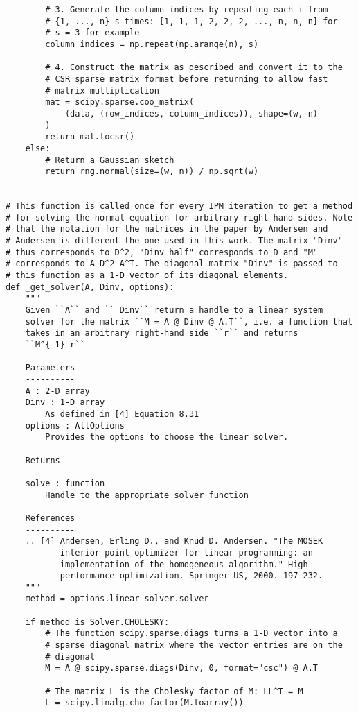 \begin{verbatim}
        # 3. Generate the column indices by repeating each i from
        # {1, ..., n} s times: [1, 1, 1, 2, 2, 2, ..., n, n, n] for
        # s = 3 for example
        column_indices = np.repeat(np.arange(n), s)

        # 4. Construct the matrix as described and convert it to the
        # CSR sparse matrix format before returning to allow fast
        # matrix multiplication
        mat = scipy.sparse.coo_matrix(
            (data, (row_indices, column_indices)), shape=(w, n)
        )
        return mat.tocsr()
    else:
        # Return a Gaussian sketch
        return rng.normal(size=(w, n)) / np.sqrt(w)


# This function is called once for every IPM iteration to get a method
# for solving the normal equation for arbitrary right-hand sides. Note
# that the notation for the matrices in the paper by Andersen and
# Andersen is different the one used in this work. The matrix "Dinv"
# thus corresponds to D^2, "Dinv_half" corresponds to D and "M"
# corresponds to A D^2 A^T. The diagonal matrix "Dinv" is passed to
# this function as a 1-D vector of its diagonal elements.
def _get_solver(A, Dinv, options):
    """
    Given ``A`` and `` Dinv`` return a handle to a linear system
    solver for the matrix ``M = A @ Dinv @ A.T``, i.e. a function that
    takes in an arbitrary right-hand side ``r`` and returns
    ``M^{-1} r``

    Parameters
    ----------
    A : 2-D array
    Dinv : 1-D array
        As defined in [4] Equation 8.31
    options : AllOptions
        Provides the options to choose the linear solver.

    Returns
    -------
    solve : function
        Handle to the appropriate solver function

    References
    ----------
    .. [4] Andersen, Erling D., and Knud D. Andersen. "The MOSEK
           interior point optimizer for linear programming: an
           implementation of the homogeneous algorithm." High
           performance optimization. Springer US, 2000. 197-232.
    """
    method = options.linear_solver.solver

    if method is Solver.CHOLESKY:
        # The function scipy.sparse.diags turns a 1-D vector into a
        # sparse diagonal matrix where the vector entries are on the
        # diagonal
        M = A @ scipy.sparse.diags(Dinv, 0, format="csc") @ A.T

        # The matrix L is the Cholesky factor of M: LL^T = M
        L = scipy.linalg.cho_factor(M.toarray())


\end{verbatim}
